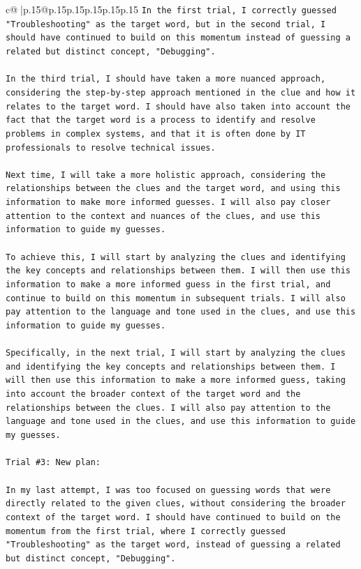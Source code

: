 \documentclass{article}
\begin{document}
{\begin{supertabular}{c@{$\;$}|p{.15\linewidth}@{}p{.15\linewidth}p{.15\linewidth}p{.15\linewidth}p{.15\linewidth}p{.15\linewidth}}
{{{\texttt{In the first trial, I correctly guessed "Troubleshooting" as the target word, but in the second trial, I should have continued to build on this momentum instead of guessing a related but distinct concept, "Debugging". } \\
\\ 
\texttt{In the third trial, I should have taken a more nuanced approach, considering the step{-}by{-}step approach mentioned in the clue and how it relates to the target word. I should have also taken into account the fact that the target word is a process to identify and resolve problems in complex systems, and that it is often done by IT professionals to resolve technical issues.} \\
\\ 
\texttt{Next time, I will take a more holistic approach, considering the relationships between the clues and the target word, and using this information to make more informed guesses. I will also pay closer attention to the context and nuances of the clues, and use this information to guide my guesses.} \\
\\ 
\texttt{To achieve this, I will start by analyzing the clues and identifying the key concepts and relationships between them. I will then use this information to make a more informed guess in the first trial, and continue to build on this momentum in subsequent trials. I will also pay attention to the language and tone used in the clues, and use this information to guide my guesses.} \\
\\ 
\texttt{Specifically, in the next trial, I will start by analyzing the clues and identifying the key concepts and relationships between them. I will then use this information to make a more informed guess, taking into account the broader context of the target word and the relationships between the clues. I will also pay attention to the language and tone used in the clues, and use this information to guide my guesses.} \\
\\ 
\texttt{Trial \#3: New plan: } \\
\\ 
\texttt{In my last attempt, I was too focused on guessing words that were directly related to the given clues, without considering the broader context of the target word. I should have continued to build on the momentum from the first trial, where I correctly guessed "Troubleshooting" as the target word, instead of guessing a related but distinct concept, "Debugging". } \\
}}}
\end{supertabular}}
\end{document}

